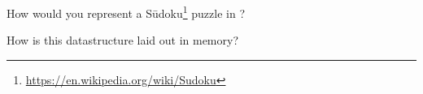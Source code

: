 How would you represent a Sūdoku\footnote{\url{https://en.wikipedia.org/wiki/Sudoku}} puzzle in \csharp?

How is this datastructure laid out in memory?
